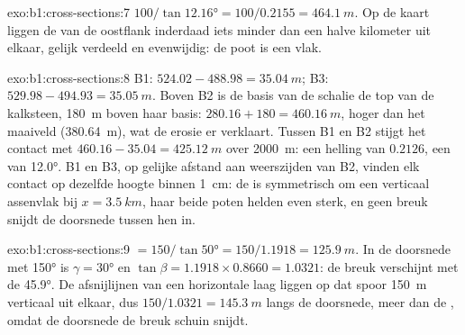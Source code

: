 \begin{solution}{exo:b1:cross-sections:7}
$100/\tan\ang{12.16} = 100/0.2155 = \qty{464.1}{m}$. Op de kaart liggen de  van de
oostflank inderdaad iets minder dan een halve kilometer uit elkaar, gelijk verdeeld en evenwijdig: de
poot is een vlak.
\end{solution}

\begin{solution}{exo:b1:cross-sections:8}
B1: $524.02 - 488.98 = \qty{35.04}{m}$; B3: $529.98 - 494.93 =
\qty{35.05}{m}$. Boven B2 is de basis van de schalie de top van de kalksteen, \qty{180}{m} boven haar
basis: $280.16 + 180 = \qty{460.16}{m}$, hoger dan het maaiveld (\qty{380.64}{m}), wat de erosie er
verklaart. Tussen B1 en B2 stijgt het contact met $460.16 - 35.04 = \qty{425.12}{m}$
over \qty{2000}{m}: een helling van $0.2126$, een  van \ang{12.0}. B1
en B3, op gelijke afstand aan weerszijden van B2, vinden elk contact op dezelfde hoogte binnen
\qty{1}{cm}: de  is symmetrisch om een verticaal assenvlak bij $x = \qty{3.5}{km}$, haar
beide poten helden even sterk, en geen breuk snijdt de doorsnede tussen hen in.
\end{solution}

\begin{solution}{exo:b1:cross-sections:9}
 $= 150/\tan\ang{50} = 150/1.1918 = \qty{125.9}{m}$. In de doorsnede met
 \ang{150} is $\gamma = \ang{30}$ en $\tan\beta = 1.1918\times0.8660 =
1.0321$: de breuk verschijnt met de  \ang{45.9}. De afsnijlijnen van een horizontale laag liggen
op dat spoor \qty{150}{m} verticaal uit elkaar, dus $150/1.0321 = \qty{145.3}{m}$ langs de doorsnede,
meer dan de , omdat de doorsnede de breuk schuin snijdt.
\end{solution}

